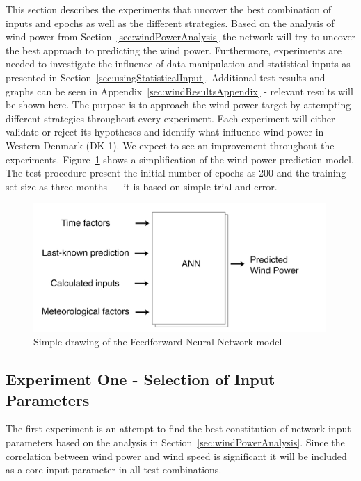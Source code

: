 This section describes the experiments that uncover the best combination of inputs and epochs as well as the different strategies. Based on the analysis of wind power from Section~\ref{sec:windPowerAnalysis} the network will try to uncover the best approach to predicting the wind power. Furthermore, experiments are needed to investigate the influence of data manipulation and statistical inputs as presented in Section~\ref{sec:usingStatisticalInput}. Additional test results and graphs can be seen in Appendix~\ref{sec:windResultsAppendix} - relevant results will be shown here. The purpose is to approach the wind power target by attempting different strategies throughout every experiment. Each experiment will either validate or reject its hypotheses and identify what influence wind power in Western Denmark (DK-1). We expect to see an improvement throughout the experiments. Figure~\ref{fig:WindPowerNetworkModel} shows a simplification of the wind power prediction model. The test procedure present the initial number of epochs as 200 and the training set size as three months --- it is based on simple trial and error.  

\begin{figure}[H]
\centering
\includegraphics[width=0.99\textwidth]{billeder/WindPowerNetworkModel.png}
\caption{Simple drawing of the Feedforward Neural Network model}
\label{fig:WindPowerNetworkModel}
\end{figure} 

\subsection{Experiment One - Selection of Input Parameters}
\label{sec:windPowerExperimentOne}
The first experiment is an attempt to find the best constitution of network input parameters based on the analysis in Section~\ref{sec:windPowerAnalysis}. Since the correlation between wind power and wind speed is significant it will be included as a core input parameter in all test combinations.

